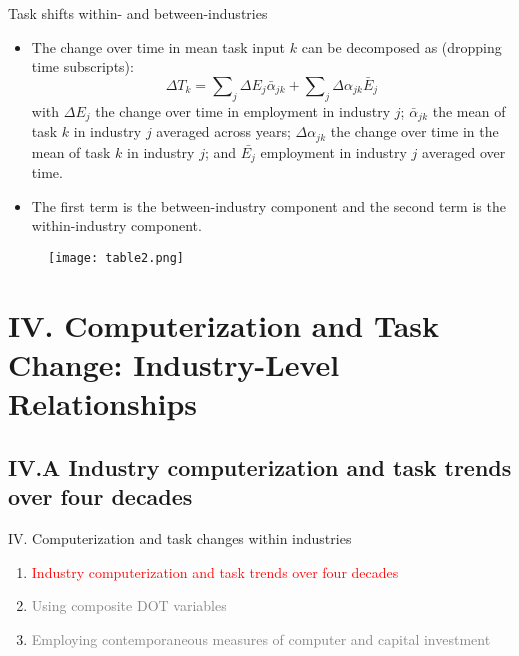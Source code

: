 \documentclass[notes=show]{beamer}
\begin{document}
\begin{frame}{Task shifts within- and between-industries}
\begin{itemize}
\item The change over time in mean task input $k$ can be decomposed as (dropping time subscripts):
\[
\Delta T_{k}=\sum\nolimits_{j} \Delta E_{j} \bar{\alpha}_{jk}+\sum\nolimits_{j} \Delta \alpha _{jk} \bar{E}_{j} 
\]
with $ \Delta E_{j}$ the change over time in employment in industry $j$; $ \bar{ \alpha}_{jk}$ the mean of task $k$ in industry $j$ averaged across years; $ \Delta \alpha_{jk}$ the change over time in the mean of task $k$ in industry $j$; and $ \bar{E_{j}}$ employment in industry $j$ averaged over time.\bigskip
\item The first term is the between-industry component and the second term is the within-industry component.
\end{itemize}
\end{frame}

\newpage
\begin{center}
\begin{figure}
\texttt{[image: table2.png]}
\end{figure} 
\end{center}
\newpage

\section{IV. Computerization and Task Change: Industry-Level Relationships}

\subsection{IV.A Industry computerization and task trends over four decades}

\begin{frame}{IV. Computerization and task changes within industries}
\begin{enumerate}
\item[\textcolor{red}{IV.A}] \textcolor{red}{Industry computerization and task trends over four decades} \bigskip
\item[\textcolor{gray}{IV.B}] \textcolor{gray}{Using composite DOT variables} \bigskip
\item[\textcolor{gray}{IV.C}] \textcolor{gray}{Employing contemporaneous measures of computer and capital investment}
\end{enumerate}
\end{frame}
\end{document}
